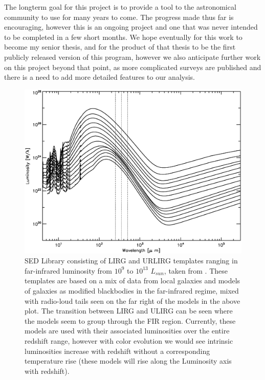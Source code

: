 \documentclass[twocolumn,letterpaper,10pt]{article}
\begin{document}
The longterm goal for this project is to provide a tool to the astronomical community to use for many years to come. The progress made thus far is encouraging, however this is an ongoing project and one that was never intended to be completed in a few short months. We hope eventually for this work to become my senior thesis, and for the product of that thesis to be the first publicly released version of this program, however we also anticipate further work on this project beyond that point, as more complicated surveys are published and there is a need to add more detailed features to our analysis.




\begin{figure}
  \includegraphics[width=\textwidth,trim=0.25in 0.25in 0.25in 0.25in,clip=true]{models.eps}
  \caption{SED Library consisting of LIRG and URLIRG templates ranging in far-infrared luminosity from $10^9$ to $10^13$ $L_{sun}$, taken from \citet{rieke09}. These templates are based on a mix of data from local galaxies and models of galaxies as modified blackbodies in the far-infrared regime, mixed with radio-loud tails seen on the far right of the models in the above plot. The transition between LIRG and ULIRG can be seen where the models seem to group through the FIR region. Currently, these models are used with their associated luminosities over the entire redshift range, however with color evolution we would see intrinsic luminosities increase with redshift without a corresponding temperature rise (these models will rise along the Luminosity axis with redshift).}
  \label{slib}
\end{figure}
\end{document}
